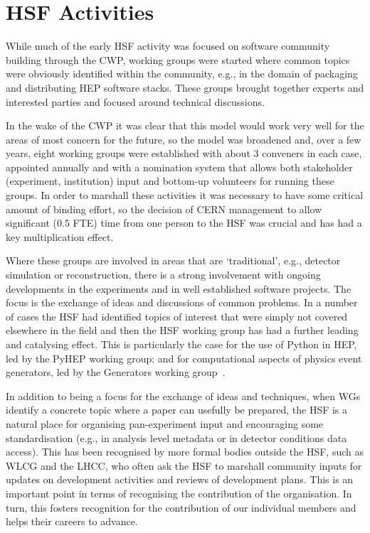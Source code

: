 \documentclass{article}
\begin{document}
\hypertarget{hsf-activities}{%
\section{HSF Activities}\label{hsf-activities}}

While much of the early HSF activity was focused on software community
building through the CWP, working groups were started where common
topics were obviously identified within the community, e.g., in the
domain of packaging and distributing HEP software stacks. These groups
brought together experts and interested parties and focused around
technical discussions.

In the wake of the CWP it was clear that this model would work very well
for the areas of most concern for the future, so the model was broadened
and, over a few years, eight working groups were established with about
3 conveners in each case, appointed annually and with a nomination
system that allows both stakeholder (experiment, institution) input and
bottom-up volunteers for running these groups. In order to marshall
these activities it was necessary to have some critical amount of
binding effort, so the decision of CERN management to allow significant
(0.5 FTE) time from one person to the HSF was crucial and has had a key
multiplication effect.

Where these groups are involved in areas that are `traditional', e.g.,
detector simulation or reconstruction, there is a strong involvement
with ongoing developments in the experiments and in well established
software projects. The focus is the exchange of ideas and discussions of
common problems. In a number of cases the HSF had identified topics of
interest that were simply not covered elsewhere in the field and then
the HSF working group has had a further leading and catalysing effect.
This is particularly the case for the use of Python in HEP, led by the
PyHEP working group; and for computational aspects of physics event
generators, led by the Generators working group~\cite{Valassi2021}.

In addition to being a focus for the exchange of ideas and techniques,
when WGs identify a concrete topic where a paper can usefully be
prepared, the HSF is a natural place for organising pan-experiment input
and encouraging some standardisation (e.g., in analysis level metadata
or in detector conditions data access). This has been recognised by more
formal bodies outside the HSF, such as WLCG and the LHCC, who often ask
the HSF to marshall community inputs for updates on development
activities and reviews of development plans. This is an important point
in terms of recognising the contribution of the organisation. In turn,
this fosters recognition for the contribution of our individual members
and helps their careers to advance.
\end{document}
